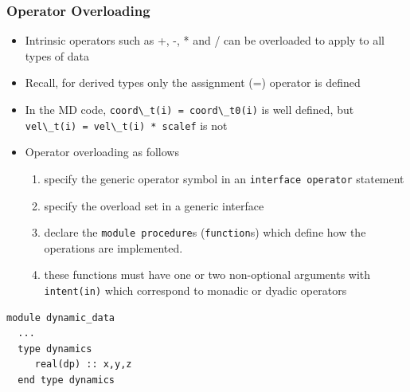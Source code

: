 \documentclass[c,mathserif,compress,xcolor=svgnames]{beamer}
\newcommand{\lstfortran}[1]{\lstinline[language={[90]Fortran},basicstyle=\footnotesize\ttfamily]|#1|}
\begin{document}
\begin{frame}
  \frametitle{\small Operator Overloading}
  \begin{itemize}
    \item Intrinsic operators such as +, -, * and / can be overloaded to apply to all types of data
    \item Recall, for derived types only the assignment (=) operator is defined
    \item In the MD code, \lstfortran{coord\_t(i) = coord\_t0(i)} is well defined, but \lstfortran{vel\_t(i) = vel\_t(i) * scalef} is not
    \item Operator overloading as follows
    \begin{enumerate}
      \item specify the generic operator symbol in an \lstfortran{interface operator} statement
      \item specify the overload set in a generic interface
      \item declare the \lstfortran{module procedure}s (\lstfortran{function}s) which define how the operations are implemented.
      \item these functions must have one or two non-optional arguments with \lstfortran{intent(in)} which correspond to monadic or dyadic operators
    \end{enumerate}
  \end{itemize}
  \framebreak
  \begin{lstlisting}[language={[90]Fortran},basicstyle=\fontsize{5}{6}\selectfont\ttfamily,multicols=2]
module dynamic_data
  ...
  type dynamics
     real(dp) :: x,y,z
  end type dynamics


\end{lstlisting}
\end{frame}
\end{document}
